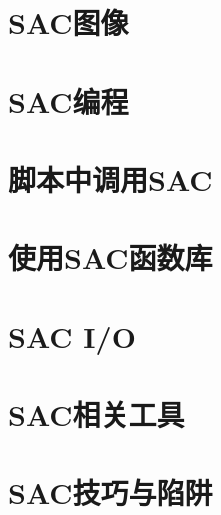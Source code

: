 \chapter{SAC图像}
\label{chap:sac-graphics}









\chapter{SAC编程}
\label{chap:sac-programming}






\chapter{脚本中调用SAC}
\label{chap:sac-script}





\chapter{使用SAC函数库}
\label{chap:sac-libs}





\chapter{SAC I/O}
\label{chap:sac-io}






\chapter{SAC相关工具}







\chapter{SAC技巧与陷阱}











